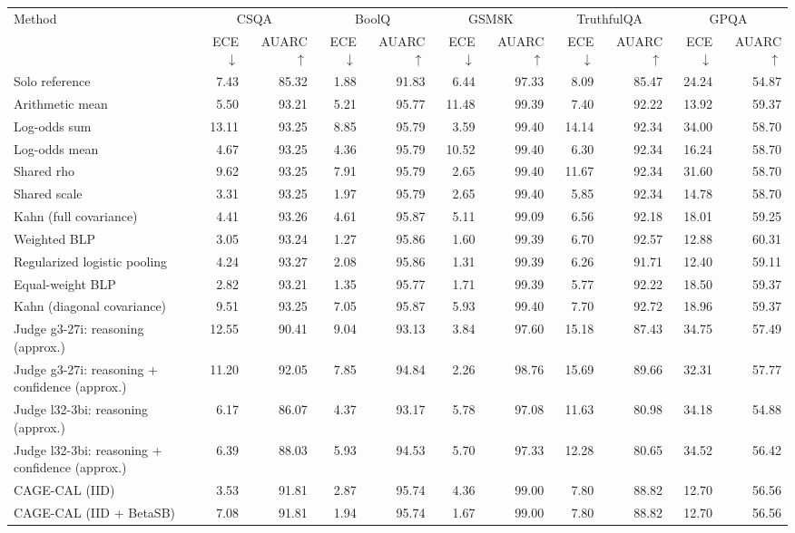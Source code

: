 \begin{tabular}{lrrrrrrrrrr}
\toprule
Method & \multicolumn{2}{c}{CSQA} & \multicolumn{2}{c}{BoolQ} & \multicolumn{2}{c}{GSM8K} & \multicolumn{2}{c}{TruthfulQA} & \multicolumn{2}{c}{GPQA} \\
 & ECE $\downarrow$ & AUARC $\uparrow$ & ECE $\downarrow$ & AUARC $\uparrow$ & ECE $\downarrow$ & AUARC $\uparrow$ & ECE $\downarrow$ & AUARC $\uparrow$ & ECE $\downarrow$ & AUARC $\uparrow$ \\
\midrule
Solo reference & 7.43 & 85.32 & 1.88 & 91.83 & 6.44 & 97.33 & 8.09 & 85.47 & 24.24 & 54.87 \\
Arithmetic mean & 5.50 & 93.21 & 5.21 & 95.77 & 11.48 & 99.39 & 7.40 & 92.22 & 13.92 & 59.37 \\
Log-odds sum & 13.11 & 93.25 & 8.85 & 95.79 & 3.59 & 99.40 & 14.14 & 92.34 & 34.00 & 58.70 \\
Log-odds mean & 4.67 & 93.25 & 4.36 & 95.79 & 10.52 & 99.40 & 6.30 & 92.34 & 16.24 & 58.70 \\
Shared rho & 9.62 & 93.25 & 7.91 & 95.79 & 2.65 & 99.40 & 11.67 & 92.34 & 31.60 & 58.70 \\
Shared scale & 3.31 & 93.25 & 1.97 & 95.79 & 2.65 & 99.40 & 5.85 & 92.34 & 14.78 & 58.70 \\
Kahn (full covariance) & 4.41 & 93.26 & 4.61 & 95.87 & 5.11 & 99.09 & 6.56 & 92.18 & 18.01 & 59.25 \\
Weighted BLP & 3.05 & 93.24 & 1.27 & 95.86 & 1.60 & 99.39 & 6.70 & 92.57 & 12.88 & 60.31 \\
Regularized logistic pooling & 4.24 & 93.27 & 2.08 & 95.86 & 1.31 & 99.39 & 6.26 & 91.71 & 12.40 & 59.11 \\
Equal-weight BLP & 2.82 & 93.21 & 1.35 & 95.77 & 1.71 & 99.39 & 5.77 & 92.22 & 18.50 & 59.37 \\
Kahn (diagonal covariance) & 9.51 & 93.25 & 7.05 & 95.87 & 5.93 & 99.40 & 7.70 & 92.72 & 18.96 & 59.37 \\
Judge g3-27i: reasoning (approx.) & 12.55 & 90.41 & 9.04 & 93.13 & 3.84 & 97.60 & 15.18 & 87.43 & 34.75 & 57.49 \\
Judge g3-27i: reasoning + confidence (approx.) & 11.20 & 92.05 & 7.85 & 94.84 & 2.26 & 98.76 & 15.69 & 89.66 & 32.31 & 57.77 \\
Judge l32-3bi: reasoning (approx.) & 6.17 & 86.07 & 4.37 & 93.17 & 5.78 & 97.08 & 11.63 & 80.98 & 34.18 & 54.88 \\
Judge l32-3bi: reasoning + confidence (approx.) & 6.39 & 88.03 & 5.93 & 94.53 & 5.70 & 97.33 & 12.28 & 80.65 & 34.52 & 56.42 \\
CAGE-CAL (IID) & 3.53 & 91.81 & 2.87 & 95.74 & 4.36 & 99.00 & 7.80 & 88.82 & 12.70 & 56.56 \\
CAGE-CAL (IID + BetaSB) & 7.08 & 91.81 & 1.94 & 95.74 & 1.67 & 99.00 & 7.80 & 88.82 & 12.70 & 56.56 \\
\bottomrule
\end{tabular}
